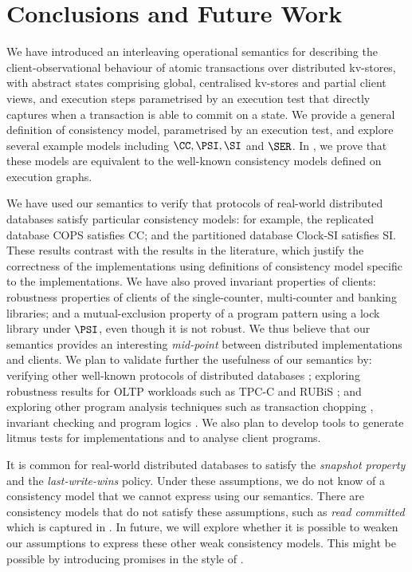 \section{Conclusions and Future Work}
\label{sec:conclusions}

We have introduced an  interleaving operational semantics for
describing the client-observational behaviour of atomic
transactions over distributed kv-stores, with abstract states 
comprising global, centralised kv-stores and  partial
client views, and execution steps parametrised by an execution test
that directly 
captures  when a transaction is able  to commit on a state.
We provide a general
definition of consistency model, parametrised by an execution test,
and explore several example models including  \( \CC, \PSI, \SI \) and \( \SER \).
In \cite{shale-phd}, we prove  that  these models are 
equivalent to the 
well-known consistency models defined on execution graphs.

We have used our semantics to verify that protocols of real-world
distributed databases satisfy particular consistency models: for
example, the replicated database COPS \cite{cops} satisfies CC; and the
partitioned database Clock-SI \cite{clocksi} satisfies SI. These results
contrast with the results in the literature, which justify the
correctness of the implementations using definitions of consistency
model specific to the implementations.  We have also proved invariant
properties of clients: robustness properties of clients of the
single-counter, multi-counter and banking libraries; and a
mutual-exclusion property of a program pattern using a lock library
under \( \PSI \), even though it is not robust.  We thus believe that our
semantics provides an interesting \emph{mid-point} between distributed
implementations and clients.  We plan to validate further the
usefulness of our semantics by: verifying other well-known protocols
of distributed databases \cite{ramp,redblue,eiger,wren}; exploring
robustness results for OLTP workloads such as TPC-C \cite{tpcc} and
RUBiS \cite{rubis}; and exploring other program analysis techniques
such as transaction chopping \cite{psi-chopping,chopping}, invariant
checking \cite{cise,repliss} and program logics \cite{alonetogether}.
We also plan to develop tools to generate litmus tests for
implementations and to analyse client programs.


It is common for real-world distributed databases to satisfy the
\emph{snapshot property} and the \emph{last-write-wins} policy. 
Under these assumptions, we do not know of a consistency
model that we cannot express using our semantics. 
There are consistency models that do not satisfy these assumptions,
such as \emph{read committed} \cite{ramp} which is  captured in \cite{seebelieve}. 
In future, we  will explore whether it is possible to weaken our
assumptions to express these 
other 
weak consistency models. This might be possible by introducing promises 
in the style of \cite{promises}. 


